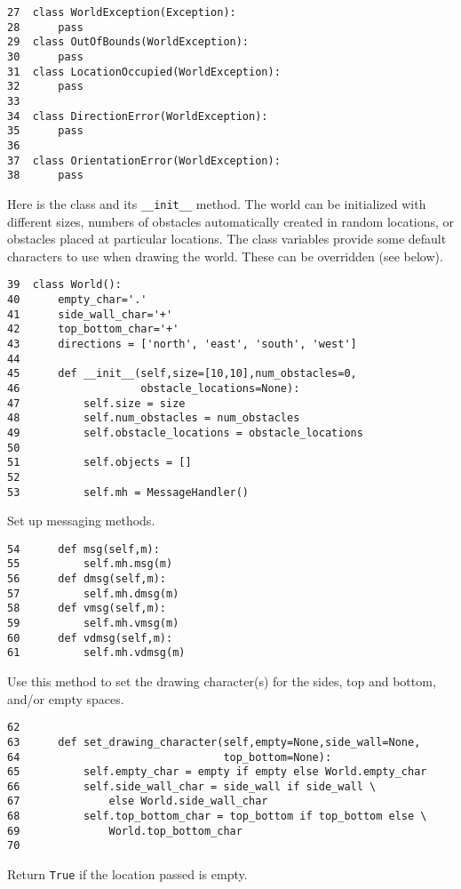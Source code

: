 \documentclass[11pt]{tufte-handout}
\begin{document}
\begin{verbatim}
27  class WorldException(Exception):
28      pass
29  class OutOfBounds(WorldException):
30      pass
31  class LocationOccupied(WorldException):
32      pass
33  
34  class DirectionError(WorldException):
35      pass
36  
37  class OrientationError(WorldException):
38      pass
\end{verbatim}



Here is the class and its \texttt{\_\_init\_\_} method.  The world can be initialized with different sizes, numbers of obstacles automatically created in random locations, or obstacles placed at particular locations.  The class variables provide some default characters to use when drawing the world.  These can be overridden (see below).

\begin{verbatim}
39  class World():
40      empty_char='.'
41      side_wall_char='+'
42      top_bottom_char='+'
43      directions = ['north', 'east', 'south', 'west']
44  
45      def __init__(self,size=[10,10],num_obstacles=0,
46                   obstacle_locations=None):
47          self.size = size
48          self.num_obstacles = num_obstacles
49          self.obstacle_locations = obstacle_locations
50  
51          self.objects = []
52  
53          self.mh = MessageHandler()
\end{verbatim}

Set up messaging methods.

\begin{verbatim}
54      def msg(self,m):
55          self.mh.msg(m)
56      def dmsg(self,m):
57          self.mh.dmsg(m)
58      def vmsg(self,m):
59          self.mh.vmsg(m)
60      def vdmsg(self,m):
61          self.mh.vdmsg(m)
\end{verbatim}

Use this method to set the drawing character(s) for the sides, top and bottom, and/or empty spaces.
\begin{verbatim}
62  
63      def set_drawing_character(self,empty=None,side_wall=None,
64                                top_bottom=None):
65          self.empty_char = empty if empty else World.empty_char
66          self.side_wall_char = side_wall if side_wall \
67              else World.side_wall_char
68          self.top_bottom_char = top_bottom if top_bottom else \
69              World.top_bottom_char
70  
\end{verbatim}

Return \texttt{True} if the location passed is empty.
\end{document}
